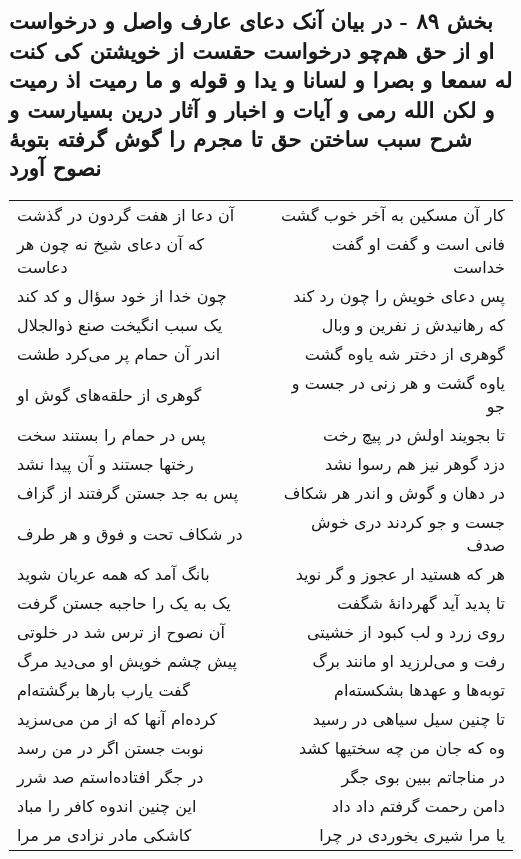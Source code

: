 \begin{center}
\section*{بخش ۸۹ - در بیان آنک دعای عارف واصل و درخواست او از حق هم‌چو درخواست حقست از خویشتن کی کنت له سمعا و بصرا و لسانا و یدا و قوله و ما رمیت اذ رمیت و لکن الله رمی و آیات و اخبار و آثار درین بسیارست و شرح سبب ساختن حق تا مجرم را گوش گرفته بتوبهٔ نصوح آورد}
\label{sec:sh089}
\begin{longtable}{l p{0.5cm} r}
آن دعا از هفت گردون در گذشت
&&
کار آن مسکین به آخر خوب گشت
\\
که آن دعای شیخ نه چون هر دعاست
&&
فانی است و گفت او گفت خداست
\\
چون خدا از خود سؤال و کد کند
&&
پس دعای خویش را چون رد کند
\\
یک سبب انگیخت صنع ذوالجلال
&&
که رهانیدش ز نفرین و وبال
\\
اندر آن حمام پر می‌کرد طشت
&&
گوهری از دختر شه یاوه گشت
\\
گوهری از حلقه‌های گوش او
&&
یاوه گشت و هر زنی در جست و جو
\\
پس در حمام را بستند سخت
&&
تا بجویند اولش در پیچ رخت
\\
رختها جستند و آن پیدا نشد
&&
دزد گوهر نیز هم رسوا نشد
\\
پس به جد جستن گرفتند از گزاف
&&
در دهان و گوش و اندر هر شکاف
\\
در شکاف تحت و فوق و هر طرف
&&
جست و جو کردند دری خوش صدف
\\
بانگ آمد که همه عریان شوید
&&
هر که هستید ار عجوز و گر نوید
\\
یک به یک را حاجبه جستن گرفت
&&
تا پدید آید گهردانهٔ شگفت
\\
آن نصوح از ترس شد در خلوتی
&&
روی زرد و لب کبود از خشیتی
\\
پیش چشم خویش او می‌دید مرگ
&&
رفت و می‌لرزید او مانند برگ
\\
گفت یارب بارها برگشته‌ام
&&
توبه‌ها و عهدها بشکسته‌ام
\\
کرده‌ام آنها که از من می‌سزید
&&
تا چنین سیل سیاهی در رسید
\\
نوبت جستن اگر در من رسد
&&
وه که جان من چه سختیها کشد
\\
در جگر افتاده‌استم صد شرر
&&
در مناجاتم ببین بوی جگر
\\
این چنین اندوه کافر را مباد
&&
دامن رحمت گرفتم داد داد
\\
کاشکی مادر نزادی مر مرا
&&
یا مرا شیری بخوردی در چرا
\\

\end{longtable}
\end{center}
